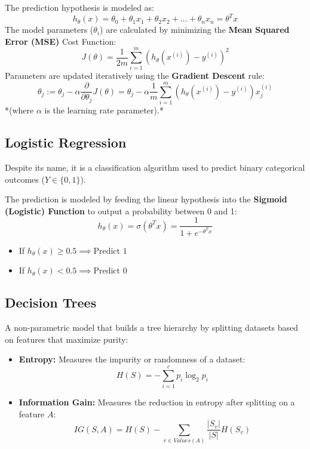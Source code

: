 \documentclass[12pt,a4paper]{article}
\begin{document}
\begin{tcolorbox}[formulabox, title={Linear Regression Modeling}]
  The prediction hypothesis is modeled as:
  $$h_\theta(x) = \theta_0 + \theta_1 x_1 + \theta_2 x_2 + \dots + \theta_n x_n = \theta^T x$$
  The model parameters ($\theta_i$) are calculated by minimizing the \textbf{Mean Squared Error (MSE)} Cost Function:
  $$J(\theta) = \frac{1}{2m} \sum_{i=1}^{m} \left( h_\theta(x^{(i)}) - y^{(i)} \right)^2$$
  Parameters are updated iteratively using the \textbf{Gradient Descent} rule:
  $$\theta_j := \theta_j - \alpha \frac{\partial}{\partial \theta_j} J(\theta) = \theta_j - \alpha \frac{1}{m} \sum_{i=1}^{m} \left( h_\theta(x^{(i)}) - y^{(i)} \right) x_j^{(i)}$$
  *(where $\alpha$ is the learning rate parameter).*
\end{tcolorbox}

\subsection{Logistic Regression}
Despite its name, it is a classification algorithm used to predict binary categorical outcomes ($Y \in \{0, 1\}$).

\begin{tcolorbox}[formulabox, title={Sigmoid Function}]
  The prediction is modeled by feeding the linear hypothesis into the \textbf{Sigmoid (Logistic) Function} to output a probability between 0 and 1:
  $$h_\theta(x) = \sigma(\theta^T x) = \frac{1}{1 + e^{-\theta^T x}}$$
  \begin{itemize}[leftmargin=*, noitemsep]
    \item If $h_\theta(x) \geq 0.5 \implies \text{Predict } 1$
    \item If $h_\theta(x) < 0.5 \implies \text{Predict } 0$
  \end{itemize}
\end{tcolorbox}

\subsection{Decision Trees}
A non-parametric model that builds a tree hierarchy by splitting datasets based on features that maximize purity:
\begin{itemize}[leftmargin=*, itemsep=3pt]
  \item \textbf{Entropy:} Measures the impurity or randomness of a dataset:
    $$H(S) = -\sum_{i=1}^{c} p_i \log_2 p_i$$
  \item \textbf{Information Gain:} Measures the reduction in entropy after splitting on a feature $A$:
    $$IG(S, A) = H(S) - \sum_{v \in Values(A)} \frac{|S_v|}{|S|} H(S_v)$$
\end{itemize}
\end{document}
